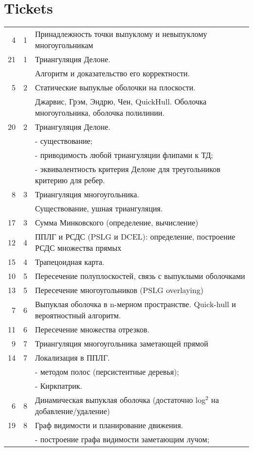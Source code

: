 \documentclass[11pt]{article}
\begin{document}
\section{Tickets}
\label{sec:orgheadline2}
\begin{center}
\begin{tabular}{rrl}
\hline
4 & 1 & Принадлежность точки выпуклому и невыпуклому многоугольникам\\
21 & 1 & Триангуляция Делоне.\\
 &  & Алгоритм и доказательство его корректности.\\
5 & 2 & Статические выпуклые оболочки на плоскости.\\
 &  & Джарвис, Грэм, Эндрю, Чен, QuickHull. Оболочка многоугольника, оболочка полилинии.\\
20 & 2 & Триангуляция Делоне.\\
 &  & - существование;\\
 &  & - приводимость любой триангуляции флипами к ТД;\\
 &  & - эквивалентность критерия Делоне для треугольников критерию для ребер.\\
8 & 3 & Триангуляция многоугольника.\\
 &  & Существование, ушная триангуляция.\\
17 & 3 & Сумма Минковского (определение, вычисление)\\
12 & 4 & ППЛГ и РСДС (PSLG и DCEL): определение, построение РСДС множества прямых\\
15 & 4 & Трапецоидная карта.\\
10 & 5 & Пересечение полуплоскостей, связь с выпуклыми оболочками\\
13 & 5 & Пересечение многоугольников (PSLG overlaying)\\
7 & 6 & Выпуклая оболочка в n-мерном пространстве. Quick-hull и вероятностный алгоритм.\\
11 & 6 & Пересечение множества отрезков.\\
9 & 7 & Триангуляция многоугольника заметающей прямой\\
14 & 7 & Локализация в ППЛГ.\\
 &  & - методом полос (персистентные деревья);\\
 &  & - Киркпатрик.\\
6 & 8 & Динамическая выпуклая оболочка (достаточно log\(^{\text{2}}\) на добавление/удаление)\\
19 & 8 & Граф видимости и планирование движения.\\
 &  & - построение графа видимости заметающим лучом;\\

\end{tabular}
\end{center}
\end{document}
